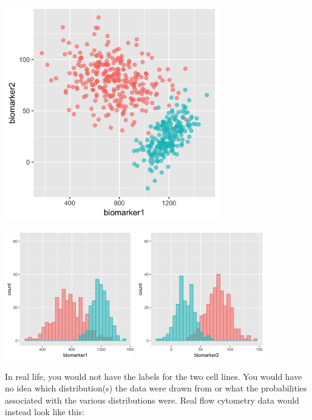 \begin{center}
    \includegraphics[width=0.7\textwidth]{img/biomarker-data-big-labels.png}
    \par\bigskip
    \includegraphics[width=0.42\textwidth]{img/biomarker-data-biomarker1-big-labels.png} \qquad
    \includegraphics[width=0.42\textwidth]{img/biomarker-data-biomarker2-big-labels.png}
\end{center}

In real life, you would not have the labels for the two cell lines. You would have no idea which distribution(s) the data were drawn from or what the probabilities associated with the various distributions were. Real flow cytometry data would instead look like this:

